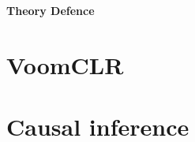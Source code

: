 \documentclass{article} %
\begin{document}
    \begin{center}
        \Large{\textbf{Theory Defence}}
    \end{center}
    \vspace{15pt}

    
    
    \section{VoomCLR}
        
        
    \section{Causal inference}
    
    \newpage
    
\end{document}
